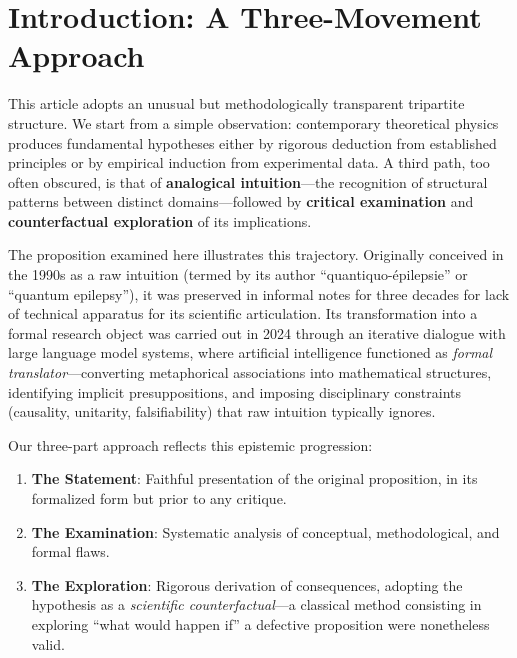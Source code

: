 \documentclass[11pt,a4paper]{article}
\begin{document}
\section*{Introduction: A Three-Movement Approach}

This article adopts an unusual but methodologically transparent tripartite structure. We start from a simple observation: contemporary theoretical physics produces fundamental hypotheses either by rigorous deduction from established principles or by empirical induction from experimental data. A third path, too often obscured, is that of \textbf{analogical intuition}---the recognition of structural patterns between distinct domains---followed by \textbf{critical examination} and \textbf{counterfactual exploration} of its implications.

The proposition examined here illustrates this trajectory. Originally conceived in the 1990s as a raw intuition (termed by its author ``quantiquo-épilepsie'' or ``quantum epilepsy''), it was preserved in informal notes for three decades for lack of technical apparatus for its scientific articulation. Its transformation into a formal research object was carried out in 2024 through an iterative dialogue with large language model systems, where artificial intelligence functioned as \textit{formal translator}---converting metaphorical associations into mathematical structures, identifying implicit presuppositions, and imposing disciplinary constraints (causality, unitarity, falsifiability) that raw intuition typically ignores.

Our three-part approach reflects this epistemic progression:

\begin{enumerate}[label=\textbf{\Roman*.}]
    \item \textbf{The Statement}: Faithful presentation of the original proposition, in its formalized form but prior to any critique.
    \item \textbf{The Examination}: Systematic analysis of conceptual, methodological, and formal flaws.
    \item \textbf{The Exploration}: Rigorous derivation of consequences, adopting the hypothesis as a \textit{scientific counterfactual}---a classical method consisting in exploring ``what would happen if'' a defective proposition were nonetheless valid.
\end{enumerate}
\end{document}
